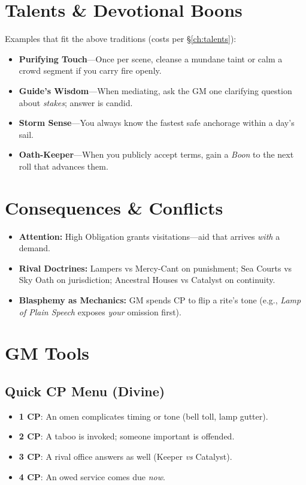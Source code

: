 \begin{multicols}{2}
\section{Talents \& Devotional Boons}
Examples that fit the above traditions (costs per \S\ref{ch:talents}):
\begin{itemize}
  \item \textbf{Purifying Touch}—Once per scene, cleanse a mundane taint or calm a crowd segment if you carry fire openly.
  \item \textbf{Guide’s Wisdom}—When mediating, ask the GM one clarifying question about \emph{stakes}; answer is candid.
  \item \textbf{Storm Sense}—You always know the fastest safe anchorage within a day’s sail.
  \item \textbf{Oath-Keeper}—When you publicly accept terms, gain a \emph{Boon} to the next roll that advances them.
\end{itemize}

\section{Consequences \& Conflicts}
\begin{itemize}
  \item \textbf{Attention:} High Obligation grants visitations—aid that arrives \emph{with} a demand.
  \item \textbf{Rival Doctrines:} Lampers vs Mercy-Cant on punishment; Sea Courts vs Sky Oath on jurisdiction; Ancestral Houses vs Catalyst on continuity.
  \item \textbf{Blasphemy as Mechanics:} GM spends CP to flip a rite’s tone (e.g., \emph{Lamp of Plain Speech} exposes \emph{your} omission first).
\end{itemize}

\section{GM Tools}
\subsection*{Quick CP Menu (Divine)}
\begin{itemize}
  \item \textbf{1 CP}: An omen complicates timing or tone (bell toll, lamp gutter).
  \item \textbf{2 CP}: A taboo is invoked; someone important is offended.
  \item \textbf{3 CP}: A rival office answers as well (Keeper \emph{vs} Catalyst).
  \item \textbf{4 CP}: An owed service comes due \emph{now}.
\end{itemize}


\end{multicols}
